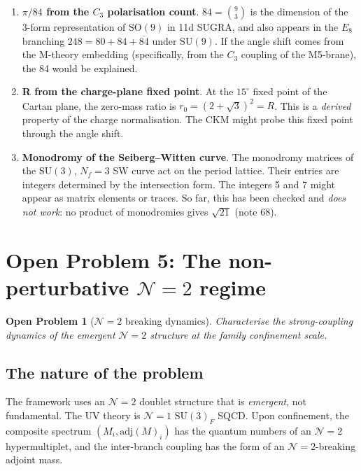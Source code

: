 \documentclass[12pt,a4paper]{article}
\newcommand{\SU}{\mathrm{SU}}
\newcommand{\adj}{\mathrm{adj}}
\newtheorem{problem}{Open Problem}
\begin{document}
\begin{enumerate}[label=(\alph*)]
\item \textbf{$\pi/84$ from the $C_3$ polarisation count}.
  $84 = \binom{9}{3}$ is the dimension of the 3-form representation
  of $\mathrm{SO}(9)$ in 11d SUGRA, and also appears in the $E_8$
  branching $248 = 80 + 84 + \overline{84}$ under $\SU(9)$.  If the angle
  shift comes from the M-theory embedding (specifically, from the $C_3$
  coupling of the M5-brane), the 84 would be explained.

\item \textbf{R from the charge-plane fixed point}.  At the $15^\circ$
  fixed point of the Cartan plane, the zero-mass ratio is
  $r_0 = (2+\sqrt{3})^2 = R$.  This is a \emph{derived} property of
  the charge normalisation.  The CKM might probe this fixed point
  through the angle shift.

\item \textbf{Monodromy of the Seiberg--Witten curve}.
  The monodromy matrices of the $\SU(3)$, $N_f = 3$ SW curve act on
  the period lattice.  Their entries are integers determined by the
  intersection form.  The integers 5 and 7 might appear as matrix
  elements or traces.  So far, this has been checked and
  \emph{does not work}: no product of monodromies gives $\sqrt{21}$
  (note 68).
\end{enumerate}


\section{Open Problem 5: The non-perturbative $\mathcal{N}{=}2$ regime}
\label{sec:n2}

\begin{problem}[$\mathcal{N}{=}2$ breaking dynamics]
Characterise the strong-coupling dynamics of the emergent
$\mathcal{N}{=}2$ structure at the family confinement scale.
\end{problem}

\subsection{The nature of the problem}

The framework uses an $\mathcal{N}{=}2$ doublet structure that is
\emph{emergent}, not fundamental.  The UV theory is $\mathcal{N}{=}1$
$\SU(3)_F$ SQCD.  Upon confinement, the composite spectrum
$(M_i, \adj(M)_i)$ has the quantum numbers of an $\mathcal{N}{=}2$
hypermultiplet, and the inter-branch coupling has the form of an
$\mathcal{N}{=}2$-breaking adjoint mass.
\end{document}
